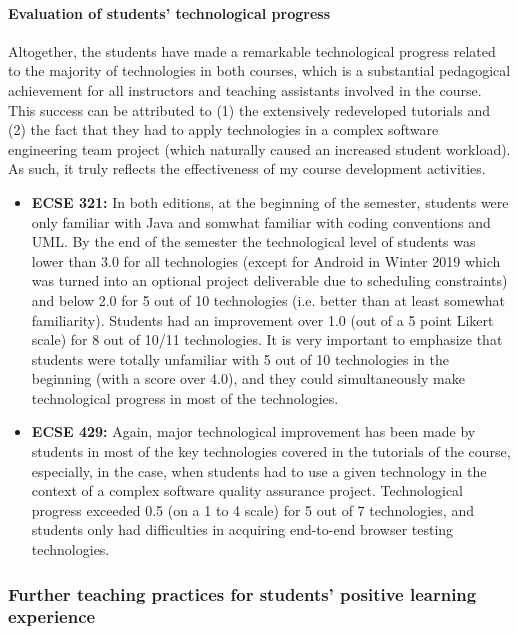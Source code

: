 \documentclass[a4paper,11pt]{article}
\begin{document}
\paragraph{Evaluation of students' technological progress}

Altogether, the students have made a remarkable technological progress related to the majority of technologies in both courses, which is a substantial pedagogical achievement for all instructors and teaching assistants involved in the course. This success can be attributed to (1) the extensively redeveloped tutorials and (2) the fact that they had to apply technologies in a complex software engineering team project (which naturally caused an increased student workload).  As such, it truly reflects the effectiveness of my course development activities. 

\begin{itemize}
\item \textbf{ECSE 321:} In both editions, at the beginning of the semester, students were only familiar with Java and somwhat familiar with coding conventions and UML. By the end of the semester the technological level of students was lower than 3.0 for all technologies (except for Android in Winter 2019 which was turned into an optional project deliverable due to scheduling constraints) and below 2.0 for 5 out of 10 technologies (i.e. better than at least somewhat familiarity). Students had an improvement over 1.0 (out of a 5 point Likert scale) for 8 out of 10/11 technologies. It is very important to emphasize that students were totally unfamiliar with 5 out of 10 technologies in the beginning (with a score over 4.0), and they could simultaneously make technological progress in most of the technologies. 

\item \textbf{ECSE 429:} Again, major technological improvement has been made by students in most of the key technologies covered in the tutorials of the course, especially, in the case, when students had to use a given technology in the context of a complex software quality assurance project. Technological progress exceeded 0.5 (on a 1 to 4 scale) for 5 out of 7 technologies, and students only had difficulties in acquiring end-to-end browser testing technologies.
\end{itemize}

\subsubsection{Further teaching practices for students' positive learning experience}
\end{document}
